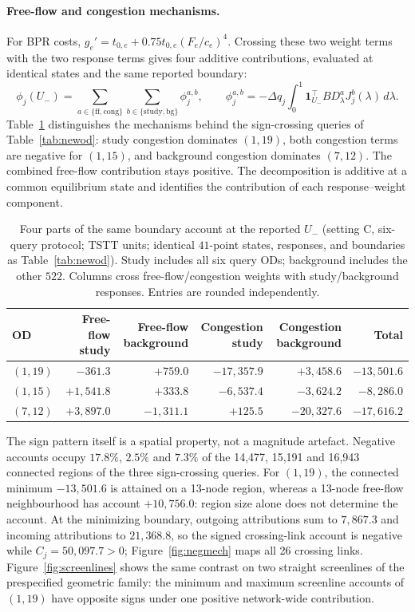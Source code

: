 \paragraph{Free-flow and congestion mechanisms.}\label{subsec:newod}
For BPR costs, $g_e'=t_{0,e}+0.75t_{0,e}(F_e/c_e)^4$. Crossing these two weight terms with the two response terms gives four additive contributions, evaluated at identical states and the same reported boundary:
\[
\phi_j(U_-)=\sum_{a\in\{\mathrm{ff,cong}\}}\sum_{b\in\{\mathrm{study,bg}\}}\phi_j^{a,b},
\qquad \phi_j^{a,b}=-\Delta q_j\int_0^1\mathbf1_{U_-}^{\top}BD_\lambda^aJ_j^b(\lambda)\,d\lambda.
\]
Table~\ref{tab:ffcong} distinguishes the mechanisms behind the sign-crossing queries of Table~\ref{tab:newod}: study congestion dominates $(1,19)$, both congestion terms are negative for $(1,15)$, and background congestion dominates $(7,12)$. The combined free-flow contribution stays positive. The decomposition is additive at a common equilibrium state and identifies the contribution of each response--weight component.
\begin{table}[pos=htbp]
\caption{Four parts of the same boundary account at the reported
$U_-$ (setting C, six-query protocol; TSTT units; identical $41$-point
states, responses, and boundaries as Table~\ref{tab:newod}). Study
includes all six query ODs; background includes the other $522$.
Columns cross free-flow/congestion weights with study/background
responses. Entries are rounded independently.}\label{tab:ffcong}
\small
\begin{tabular*}{\tblwidth}{@{\extracolsep{\fill}}lrrrrr}
\toprule
OD & Free-flow study & Free-flow background & Congestion study & Congestion background & Total\\
\midrule
$(1,19)$ & $-361.3$ & $+759.0$ & $-17{,}357.9$ & $+3{,}458.6$ & $-13{,}501.6$ \\
$(1,15)$ & $+1{,}541.8$ & $+333.8$ & $-6{,}537.4$ & $-3{,}624.2$ & $-8{,}286.0$ \\
$(7,12)$ & $+3{,}897.0$ & $-1{,}311.1$ & $+125.5$ & $-20{,}327.6$ & $-17{,}616.2$ \\
\bottomrule
\end{tabular*}
\end{table}
The sign pattern itself is a spatial property, not a magnitude artefact. Negative accounts occupy $17.8\%$, $2.5\%$ and $7.3\%$ of the 14,477, 15,191 and 16,943 connected regions of the three sign-crossing queries. For $(1,19)$, the connected minimum $-13{,}501.6$ is attained on a 13-node region, whereas a 13-node free-flow neighbourhood has account $+10{,}756.0$: region size alone does not determine the account. At the minimizing boundary, outgoing attributions sum to $7{,}867.3$ and incoming attributions to $21{,}368.8$, so the signed crossing-link account is negative while $C_j=50{,}097.7>0$; Figure~\ref{fig:negmech} maps all 26 crossing links. Figure~\ref{fig:screenlines} shows the same contrast on two straight screenlines of the prespecified geometric family: the minimum and maximum screenline accounts of $(1,19)$ have opposite signs under one positive network-wide contribution.
